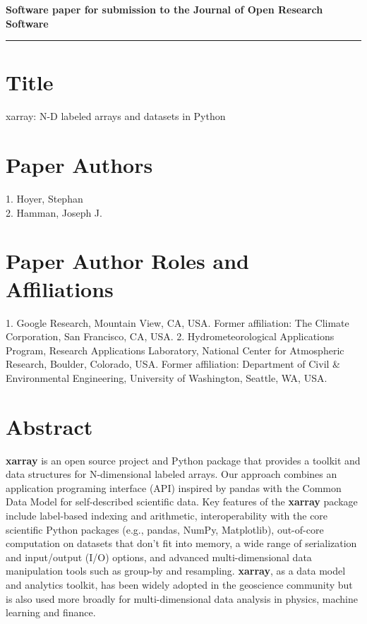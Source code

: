 \documentclass{jors}
\begin{document}
{\bf Software paper for submission to the Journal of Open Research Software} \\



\rule{\textwidth}{1pt}

\vspace{0.5cm}

\section*{Title}

xarray: N-D labeled arrays and datasets in Python

\section*{Paper Authors}

{1. Hoyer, Stephan \\
 2. Hamman, Joseph J.}

\section*{Paper Author Roles and Affiliations}
{1. Google Research, Mountain View, CA, USA. Former affiliation: The Climate Corporation, San Francisco, CA, USA. 2. Hydrometeorological Applications Program, Research Applications Laboratory, National Center for Atmospheric Research, Boulder, Colorado, USA. Former affiliation: Department of Civil \& Environmental Engineering, University of Washington, Seattle, WA, USA.}

\section*{Abstract}

\textbf{xarray} is an open source project and Python package that provides a toolkit and data structures for N-dimensional labeled arrays.
Our approach combines an application programing interface (API) inspired by pandas with the Common Data Model for self-described scientific data.
Key features of the \textbf{xarray} package include label-based indexing and arithmetic, interoperability with the core scientific Python packages (e.g., pandas, NumPy, Matplotlib), out-of-core computation on datasets that don't fit into memory, a wide range of serialization and input/output (I/O) options, and advanced multi-dimensional data manipulation tools such as group-by and resampling.
\textbf{xarray}, as a data model and analytics toolkit, has been widely adopted in the geoscience community but is also used more broadly for multi-dimensional data analysis in physics, machine learning and finance.
\end{document}

